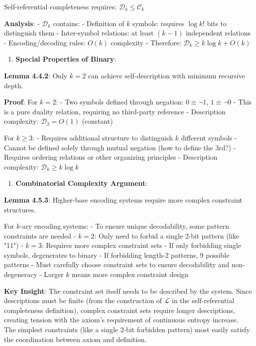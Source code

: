    Self-referential completeness requires: $\mathcal{D}_k \leq \mathcal{C}_k$
   
   \textbf{Analysis}:
   - $\mathcal{D}_k$ contains:
     - Definition of $k$ symbols: requires $\log k!$ bits to distinguish them
     - Inter-symbol relations: at least $(k-1)$ independent relations
     - Encoding/decoding rules: $O(k)$ complexity
   - Therefore: $\mathcal{D}_k \geq k \log k + O(k)$
   
\begin{enumerate}
\item \textbf{Special Properties of Binary}:
\end{enumerate}
   
   \textbf{Lemma 4.4.2}: Only $k=2$ can achieve self-description with minimum recursive depth.
\label{lemma:2.5.1}
   
   \textbf{Proof}:
   For $k=2$:
   - Two symbols defined through negation: $0 \equiv \neg 1$, $1 \equiv \neg 0$
   - This is a pure duality relation, requiring no third-party reference
   - Description complexity: $\mathcal{D}_2 = O(1)$ (constant)
   
   For $k \geq 3$:
   - Requires additional structure to distinguish $k$ different symbols
   - Cannot be defined solely through mutual negation (how to define the 3rd?)
   - Requires ordering relations or other organizing principles
   - Description complexity: $\mathcal{D}_k \geq k \log k$

\begin{enumerate}
\item \textbf{Combinatorial Complexity Argument}:
\end{enumerate}
   
   \textbf{Lemma 4.5.3}: Higher-base encoding systems require more complex constraint structures.
\label{lemma:2.5.2}
   
   For $k$-ary encoding systems:
   - To ensure unique decodability, some pattern constraints are needed
   - $k=2$: Only need to forbid a single 2-bit pattern (like "11")
   - $k=3$: Requires more complex constraint sets
     - If only forbidding single symbols, degenerates to binary
     - If forbidding length-2 patterns, 9 possible patterns
     - Must carefully choose constraint sets to ensure decodability and non-degeneracy
   - Larger $k$ means more complex constraint design
   
   \textbf{Key Insight}: The constraint set itself needs to be described by the system. Since descriptions must be finite (from the construction of $\mathcal{L}$ in the self-referential completeness definition), complex constraint sets require longer descriptions, creating tension with the axiom's requirement of continuous entropy increase. The simplest constraints (like a single 2-bit forbidden pattern) most easily satisfy the coordination between axiom and definition.
   
